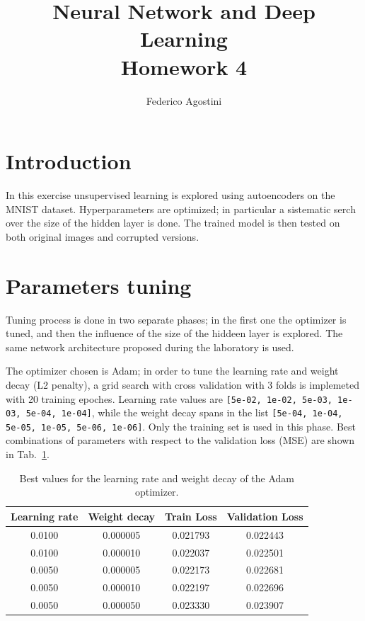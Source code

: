 \documentclass[a4paper,11pt]{article}
\title{Neural Network and Deep Learning \\ Homework 4}
\author{Federico Agostini}
\date{}
\begin{document}
\maketitle

\section{Introduction}
In this exercise unsupervised learning is explored using autoencoders on the MNIST dataset. Hyperparameters are optimized; in particular a sistematic serch over the size of the hidden layer is done. The trained model is then tested on both original images and corrupted versions.

\section{Parameters tuning}

Tuning process is done in two separate phases; in the first one the optimizer is tuned, and then the influence of the size of the hiddeen layer is explored. The same network architecture proposed during the laboratory is used.

The optimizer chosen is Adam; in order to tune the learning rate and weight decay (L2 penalty), a grid search with cross validation with 3 folds is implemeted with 20 training epoches. Learning rate values are \texttt{[5e-02, 1e-02, 5e-03, 1e-03, 5e-04, 1e-04]}, while the weight decay spans in the list \texttt{[5e-04, 1e-04, 5e-05, 1e-05, 5e-06, 1e-06]}. Only the training set is used in this phase. Best combinations of parameters with respect to the validation loss (MSE) are shown in Tab.~\ref{tab:opt_loss}.

\begin{table}[hp]
  \centering
  \caption{Best values for the learning rate and weight decay of the Adam optimizer.}
  \label{tab:opt_loss}
  \begin{tabular}{cccc}
    \toprule
      Learning rate & Weight decay &  Train Loss &  Validation Loss \\
    \midrule
      0.0100 &  0.000005 &    0.021793 &  0.022443 \\
      0.0100 &  0.000010 &    0.022037 &  0.022501 \\
      0.0050 &  0.000005 &    0.022173 &  0.022681 \\
      0.0050 &  0.000010 &    0.022197 &  0.022696 \\
      0.0050 &  0.000050 &    0.023330 &  0.023907 \\
    \bottomrule
    \end{tabular}
\end{table}
\end{document}
